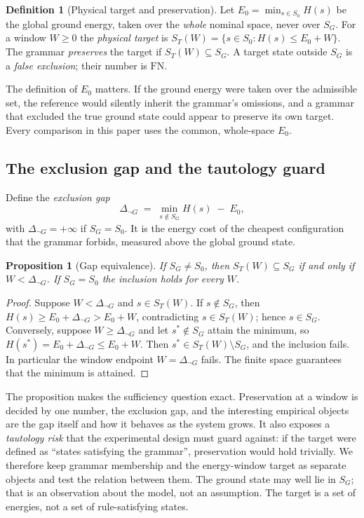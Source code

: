 \documentclass[11pt,a4paper]{article}
\theoremstyle{plain}
\newtheorem{proposition}[theorem]{Proposition}
\theoremstyle{definition}
\newtheorem{definition}[theorem]{Definition}
\theoremstyle{remark}
\newcommand{\SG}{S_{G}}
\newcommand{\Sz}{S_{0}}
\newcommand{\ST}{S_{T}}
\newcommand{\dnG}{\Delta_{\neg G}}
\newcommand{\Eo}{E_{0}}
\begin{document}
\begin{definition}[Physical target and preservation]\label{def:target}
Let $\Eo=\min_{s\in\Sz}H(s)$ be the global ground energy, taken over the \emph{whole} nominal space, never over $\SG$. For a window $W\ge0$ the \emph{physical target} is $\ST(W)=\{s\in\Sz: H(s)\le \Eo+W\}$. The grammar \emph{preserves} the target if $\ST(W)\subseteq\SG$. A target state outside $\SG$ is a \emph{false exclusion}; their number is $\mathrm{FN}$.
\end{definition}

The definition of $\Eo$ matters. If the ground energy were taken over the admissible set, the reference would silently inherit the grammar's omissions, and a grammar that excluded the true ground state could appear to preserve its own target. Every comparison in this paper uses the common, whole-space $\Eo$.

\subsection{The exclusion gap and the tautology guard}
Define the \emph{exclusion gap}
\[
\dnG \;=\; \min_{s\notin \SG}H(s)\;-\;\Eo ,
\]
with $\dnG=+\infty$ if $\SG=\Sz$. It is the energy cost of the cheapest configuration that the grammar forbids, measured above the global ground state.

\begin{proposition}[Gap equivalence]\label{prop:gap}
If $\SG\ne\Sz$, then $\ST(W)\subseteq\SG$ if and only if $W<\dnG$. If $\SG=\Sz$ the inclusion holds for every $W$.
\end{proposition}
\begin{proof}
Suppose $W<\dnG$ and $s\in\ST(W)$. If $s\notin\SG$, then $H(s)\ge \Eo+\dnG>\Eo+W$, contradicting $s\in\ST(W)$; hence $s\in\SG$. Conversely, suppose $W\ge\dnG$ and let $s^\ast\notin\SG$ attain the minimum, so $H(s^\ast)=\Eo+\dnG\le\Eo+W$. Then $s^\ast\in\ST(W)\setminus\SG$, and the inclusion fails. In particular the window endpoint $W=\dnG$ fails. The finite space guarantees that the minimum is attained.
\end{proof}

The proposition makes the sufficiency question exact. Preservation at a window is decided by one number, the exclusion gap, and the interesting empirical objects are the gap itself and how it behaves as the system grows. It also exposes a \emph{tautology risk} that the experimental design must guard against: if the target were defined as ``states satisfying the grammar'', preservation would hold trivially. We therefore keep grammar membership and the energy-window target as separate objects and test the relation between them. The ground state may well lie in $\SG$; that is an observation about the model, not an assumption. The target is a set of energies, not a set of rule-satisfying states.
\end{document}
